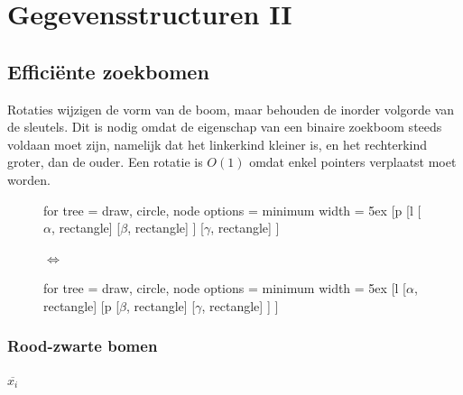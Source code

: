 \documentclass{report}
\begin{document}
	\tableofcontents
	\part{Gegevensstructuren II}
	\chapter{Efficiënte zoekbomen}
	Rotaties wijzigen de vorm van de boom, maar behouden de inorder volgorde van de sleutels. Dit is nodig omdat de eigenschap van een binaire zoekboom steeds voldaan moet zijn, namelijk dat het linkerkind kleiner is, en het rechterkind groter, dan de ouder. Een rotatie is $O(1)$ omdat enkel pointers verplaatst moet worden.
	\begin{figure}[ht]
		\centering
		\begin{adjustbox}{valign=t}
			
			\begin{forest}
				for tree = {draw, circle, node options = {minimum width = 5ex}}
				[p
					[l
						[$\alpha$, rectangle]
						[$\beta$, rectangle]
					]
					[$\gamma$, rectangle]
				]	
			\end{forest}
		\end{adjustbox}\qquad
		\begin{adjustbox}{valign=c}
		$\Leftrightarrow$
		\end{adjustbox}\qquad
		\begin{adjustbox}{valign=t}
			\begin{forest}
				for tree = {draw, circle, node options = {minimum width = 5ex}}
				[l
					[$\alpha$, rectangle]
					[p
						[$\beta$, rectangle]
						[$\gamma$, rectangle]	
					]
				]	
			\end{forest}
		\end{adjustbox}
	\end{figure}
	


	\section{Rood-zwarte bomen}

	$\overline{x_i}$
\end{document}
